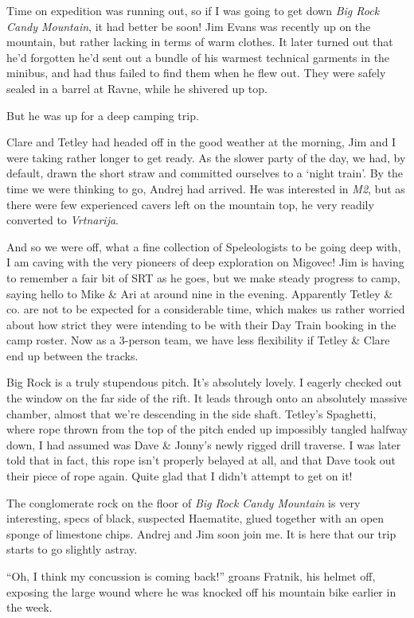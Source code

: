 Time on expedition was running out, so if I was going to get down
\emph{Big Rock Candy Mountain}, it had better be soon! Jim Evans was
recently up on the mountain, but rather lacking in terms of warm
clothes. It later turned out that he'd forgotten he'd sent out a bundle
of his warmest technical garments in the minibus, and had thus failed to
find them when he flew out. They were safely sealed in a barrel at
Ravne, while he shivered up top.

But he was up for a deep camping trip.

Clare and Tetley had headed off in the good weather at the morning, Jim
and I were taking rather longer to get ready. As the slower party of the
day, we had, by default, drawn the short straw and committed ourselves
to a `night train'. By the time we were thinking to go, Andrej had
arrived. He was interested in \emph{M2}, but as there were few
experienced cavers left on the mountain top, he very readily converted
to \emph{Vrtnarija}.

And so we were off, what a fine collection of Speleologists to be going
deep with, I am caving with the very pioneers of deep exploration on
Migovec! Jim is having to remember a fair bit of SRT as he goes, but we
make steady progress to camp, saying hello to Mike \& Ari at around nine
in the evening. Apparently Tetley \& co. are not to be expected for a
considerable time, which makes us rather worried about how strict they
were intending to be with their Day Train booking in the camp roster.
Now as a 3-person team, we have less flexibility if Tetley \& Clare end
up between the tracks.

Big Rock is a truly stupendous pitch. It's absolutely lovely. I eagerly
checked out the window on the far side of the rift. It leads through
onto an absolutely massive chamber, almost that we're descending in the
side shaft. Tetley's Spaghetti, where rope thrown from the top of the
pitch ended up impossibly tangled halfway down, I had assumed was Dave
\& Jonny's newly rigged drill traverse. I was later told that in fact,
this rope isn't properly belayed at all, and that Dave took out their
piece of rope again. Quite glad that I didn't attempt to get on it!

The conglomerate rock on the floor of \emph{Big Rock Candy Mountain} is
very interesting, specs of black, suspected Haematite, glued together
with an open sponge of limestone chips. Andrej and Jim soon join me. It
is here that our trip starts to go slightly astray.

``Oh, I think my concussion is coming back!'' groans Fratnik, his helmet
off, exposing the large wound where he was knocked off his mountain bike
earlier in the week.

